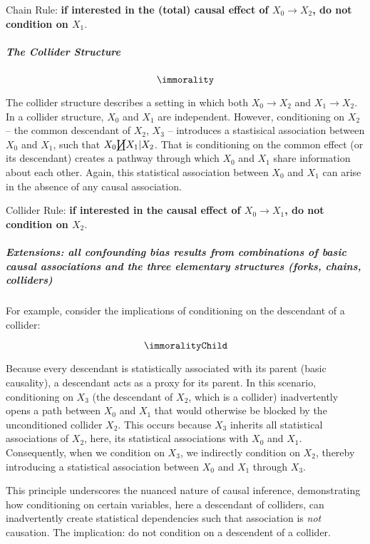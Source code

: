 \documentclass[
  singlecolumn]{article}
\let\oldsubparagraph\subparagraph
\renewcommand{\subparagraph}[1]{\oldsubparagraph{#1}\mbox{}}
\begin{document}
Chain Rule: \textbf{if interested in the (total) causal effect of
\(X_0 \to X_2\), do not condition on \(X_1\)}.

\subparagraph{The Collider Structure}\label{the-collider-structure}

\[\immorality\]

The collider structure describes a setting in which both \(X_0\to X_2\)
and \(X_1 \to X_2\). In a collider structure, \(X_0\) and \(X_1\) are
independent. However, conditioning on \(X_2\) -- the common descendant
of \(X_2\), \(X_3\) -- introduces a stastisical association between
\(X_0\) and \(X_1\), such that \(X_0 \cancel\coprod X_1 | X_2\). That is
conditioning on the common effect (or its descendant) creates a pathway
through which \(X_0\) and \(X_1\) share information about each other.
Again, this statistical association between \(X_0\) and \(X_1\) can
arise in the absence of any causal association.

Collider Rule: \textbf{if interested in the causal effect of
\(X_0 \to X_1\), do not condition on \(X_2\)}.

\subparagraph{Extensions: all confounding bias results from combinations
of basic causal associations and the three elementary structures (forks,
chains,
colliders)}\label{extensions-all-confounding-bias-results-from-combinations-of-basic-causal-associations-and-the-three-elementary-structures-forks-chains-colliders}

For example, consider the implications of conditioning on the descendant
of a collider:

\[\immoralityChild\]

Because every descendant is statistically associated with its parent
(basic causality), a descendant acts as a proxy for its parent. In this
scenario, conditioning on \(X_3\) (the descendant of \(X_2\), which is a
collider) inadvertently opens a path between \(X_0\) and \(X_1\) that
would otherwise be blocked by the unconditioned collider \(X_2\). This
occurs because \(X_3\) inherits all statistical associations of \(X_2\),
here, its statistical associations with \(X_0\) and \(X_1\).
Consequently, when we condition on \(X_3\), we indirectly condition on
\(X_2\), thereby introducing a statistical association between \(X_0\)
and \(X_1\) through \(X_3\).

This principle underscores the nuanced nature of causal inference,
demonstrating how conditioning on certain variables, here a descendant
of colliders, can inadvertently create statistical dependencies such
that association is \emph{not} causation. The implication: do not
condition on a descendent of a collider.
\end{document}
